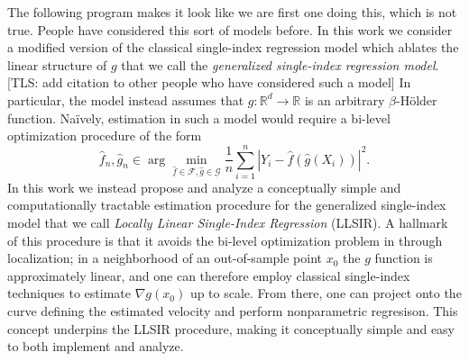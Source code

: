 \documentclass[11pt]{article}
\newcommand{\tls}[1]{{\color{cyan}[TLS: #1]}}
\begin{document}
{\color{red}The following program makes it look like we are first one doing this, which is not true. People have considered this sort of models before.}
In this work we consider a modified version of the classical single-index regression model which ablates the linear structure of $g$ that we call the \emph{generalized single-index regression model}. \tls{add citation to other people who have considered such a model} In particular, the model instead assumes that $g: \mathbb{R}^d \to \mathbb{R}$ is an arbitrary $\beta$-H\"older function. Na\"ively, estimation in such a model would require a bi-level optimization procedure of the form
\begin{equation}\label{bilevel optimization}
    \hat f_n, \hat g_n \in \arg\min_{\hat f \in \mathcal{F}, \hat g \in \mathcal{G}}\frac{1}{n}\sum_{i = 1}^n\left|Y_i - \hat f(\hat g(X_i))\right|^2.
\end{equation}
In this work we instead propose and analyze a conceptually simple and computationally tractable estimation procedure for the generalized single-index model that we call \emph{Locally Linear Single-Index Regression} (LLSIR). A hallmark of this procedure is that it avoids the bi-level optimization problem in  through localization; in a neighborhood of an out-of-sample point $x_0$ the $g$ function is approximately linear, and one can therefore employ classical single-index techniques to estimate $\nabla g(x_0)$ up to scale. From there, one can project onto the curve defining the estimated velocity and perform nonparametric regresison. This concept underpins the LLSIR procedure, making it conceptually simple and easy to both implement and analyze.
\end{document}
